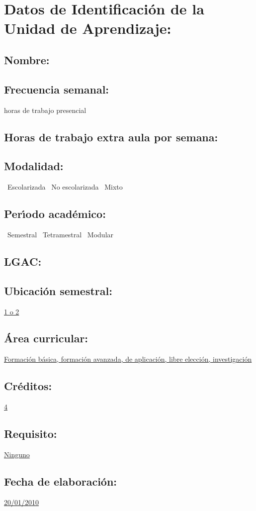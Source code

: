 \documentclass[10 pt]{article}
\begin{document}


\section{Datos de Identificaci\'{o}n de la Unidad de Aprendizaje:}
\subsection{Nombre:} 
\subsection{Frecuencia semanal:} horas de trabajo presencial 
\subsection{Horas de trabajo extra aula por semana:} 
\subsection{Modalidad:} \yes~Escolarizada \no~No escolarizada \no~Mixto
\subsection{Per\'{\i}odo acad\'{e}mico:} \yes~Semestral
\no~Tetramestral \no~Modular
\subsection{LGAC:} \underline{\seys}
\subsection{Ubicaci\'{o}n semestral:} \underline{1 o 2}
\subsection{\'{A}rea curricular:} \underline{Formaci\'{o}n b\'{a}sica,
  formaci\'{o}n avanzada, de aplicaci\'{o}n, libre elecci\'{o}n, investigaci\'{o}n}
\subsection{Cr\'{e}ditos:} \underline{4}
\subsection{Requisito:} \underline{Ninguno}
\subsection{Fecha de elaboraci\'{o}n:} \underline{20/01/2010}
\end{document}

